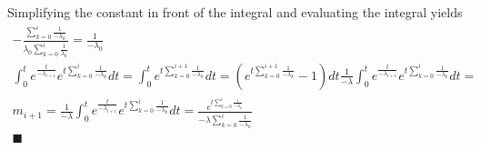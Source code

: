 \documentclass[12pt]{article}
\begin{document}
Simplifying the constant in front of the integral and evaluating the integral yields 
\begin{equation}
\begin{split}
-\frac{\sum_{k=0}^i\frac{1}{-\lambda_k}}{\lambda_0\sum_{k=0}^i\frac{1}{\lambda_k}} = \frac{1}{-\lambda_0}\\
\int_0^t e^{\frac{t}{-\lambda_{i+1}}}e^{t\sum_{k=0}^i\frac{1}{-\lambda_k}}dt = \int_0^t e^{t\sum_{k=0}^{i+1}\frac{1}{-\lambda_k}}dt = (e^{t\sum_{k=0}^{i+1}\frac{1}{-\lambda_k}}-1)dt  
\frac{1}{-\lambda}\int_0^t e^{\frac{t}{-\lambda_{i+1}}}e^{t\sum_{k=0}^i\frac{1}{-\lambda_k}}dt =  \\
m_{i+1} = \frac{1}{-\lambda}\int_0^t e^{\frac{t}{-\lambda_{i+1}}}e^{t\sum_{k=0}^i\frac{1}{-\lambda_k}}dt = \frac{e^{t\sum_{k=0}^i\frac{1}{-\lambda_k}}}{-\lambda\sum_{k=0}^i\frac{1}{-\lambda_k}}\\
\blacksquare
\end{split}
\end{equation}
\end{document}
